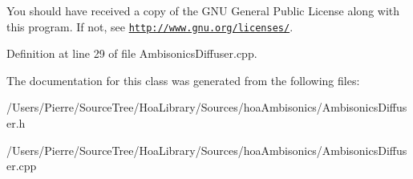 You should have received a copy of the G\-N\-U General Public License along with this program. If not, see \href{http://www.gnu.org/licenses/}{\tt http\-://www.\-gnu.\-org/licenses/}. 

Definition at line 29 of file Ambisonics\-Diffuser.\-cpp.



The documentation for this class was generated from the following files\-:\begin{DoxyCompactItemize}
\item 
/\-Users/\-Pierre/\-Source\-Tree/\-Hoa\-Library/\-Sources/hoa\-Ambisonics/Ambisonics\-Diffuser.\-h\item 
/\-Users/\-Pierre/\-Source\-Tree/\-Hoa\-Library/\-Sources/hoa\-Ambisonics/Ambisonics\-Diffuser.\-cpp\end{DoxyCompactItemize}
